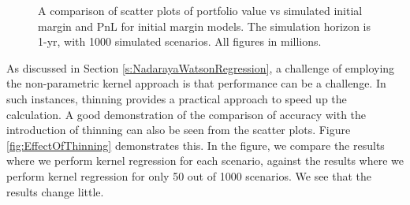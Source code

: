 \documentclass[preprint,12pt]{elsarticle}
\begin{document}
\begin{figure}[h] 
\hfill
{}
\hfill
{}
\hfill
{}
\hfill
\caption{A comparison of scatter plots of portfolio value vs simulated initial margin and PnL for initial margin models. The simulation horizon is 1-yr, with 1000 simulated scenarios. All figures in millions.}
\label{fig:PVvsPnL}
\end{figure}

As discussed in Section \ref{s:NadarayaWatsonRegression}, a challenge of employing the non-parametric kernel approach is that performance can be a challenge. In such instances, thinning provides a practical approach to speed up the calculation. A good demonstration of the comparison of accuracy with the introduction of thinning can also be seen from the scatter plots. Figure \ref{fig:EffectOfThinning} demonstrates this. In the figure, we compare the results where we perform kernel regression for each scenario, against the results where we perform kernel regression for only 50 out of 1000 scenarios.  We see that the results change little.
\end{document}
